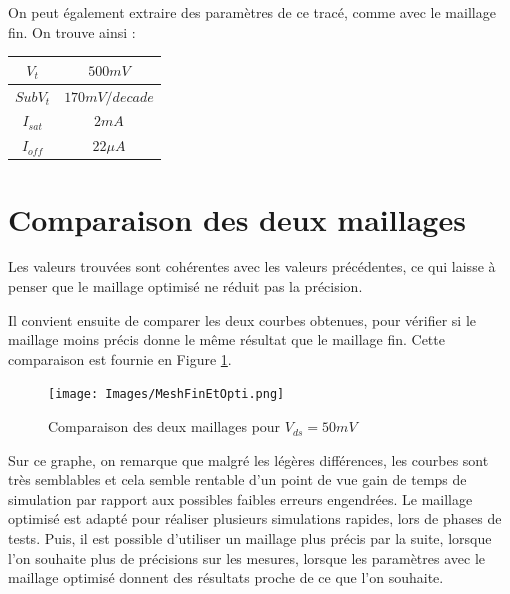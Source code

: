 \documentclass[a4paper,11pt]{report}
\begin{document}
On peut également extraire des paramètres de ce tracé, comme avec le maillage fin. On trouve ainsi :

\begin{tableau}[H]
\centering
\begin{tabular}{|c|c|}
\hline
$V_t$&$500mV$\\
\hline
$SubV_t$&$170mV/decade$\\
\hline
$I_{sat}$&$2mA$\\
\hline
$I_{off}$&$22\mu A$\\
\hline
\end{tabular}
\caption{Caractéristiques avec un maillage optimisé avec $V_{ds}=50mV$}
\end{tableau}

\section{Comparaison des deux maillages}

Les valeurs trouvées sont cohérentes avec les valeurs précédentes, ce qui laisse à penser que le maillage optimisé ne réduit pas la précision.

Il convient ensuite de comparer les deux courbes obtenues, pour vérifier si le maillage moins précis donne le même résultat que le maillage fin. Cette comparaison est fournie en Figure \ref{compMesh}.

\begin{figure}[H]
  \centering
  \texttt{[image: Images/MeshFinEtOpti.png]}
  \caption{Comparaison des deux maillages pour $V_{ds}=50mV$}
  \label{compMesh}
\end{figure}


Sur ce graphe, on remarque que malgré les légères différences, les courbes sont très semblables et cela semble rentable d'un point de vue gain de temps de simulation par rapport aux possibles faibles erreurs engendrées. Le maillage optimisé est adapté pour réaliser plusieurs simulations rapides, lors de phases de tests. Puis, il est possible d'utiliser un maillage plus précis par la suite, lorsque l'on souhaite plus de précisions sur les mesures, lorsque les paramètres avec le maillage optimisé donnent des résultats proche de ce que l'on souhaite.

%
\end{document}
